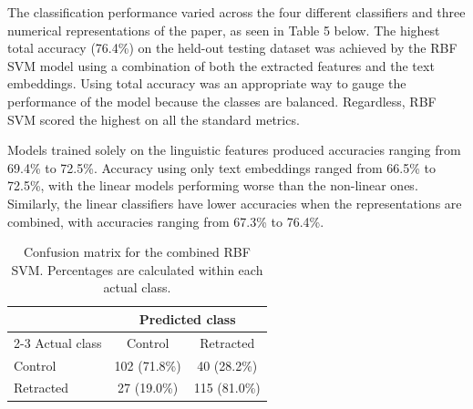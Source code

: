 \documentclass[11pt,letterpaper]{article}
\begin{document}
The classification performance varied across the four different classifiers and three numerical representations of the paper, as seen in Table 5 below. The highest total accuracy (76.4\%) on the held-out testing dataset was achieved by the RBF SVM model using a combination of both the extracted features and the text embeddings. Using total accuracy was an appropriate way to gauge the performance of the model because the classes are balanced. Regardless, RBF SVM scored the highest on all the standard metrics.

Models trained solely on the linguistic features produced accuracies ranging from 69.4\% to 72.5\%. Accuracy using only text embeddings ranged from 66.5\% to 72.5\%, with the linear models performing worse than the non-linear ones. Similarly, the linear classifiers have lower accuracies when the representations are combined, with accuracies ranging from 67.3\% to 76.4\%.

\begin{table}[H]
\centering
\caption{Confusion matrix for the combined RBF SVM. Percentages are calculated
within each actual class.}
\label{tab:best-confusion-matrix}

\small
\begin{tabular}{lcc}
\toprule
 & \multicolumn{2}{c}{Predicted class} \\
\cmidrule(lr){2-3}
Actual class & Control & Retracted \\
\midrule
Control
    & 102 (71.8\%)
    & 40 (28.2\%) \\

Retracted
    & 27 (19.0\%)
    & 115 (81.0\%) \\
\bottomrule
\end{tabular}
\end{table}
\end{document}

